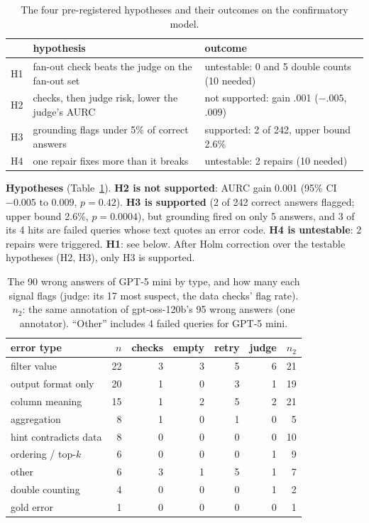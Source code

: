 \documentclass[conference]{IEEEtran}
\begin{document}
\begin{table}[t]
\centering\footnotesize
\setlength{\tabcolsep}{3pt}
\begin{tabular}{@{}lp{36mm}p{38mm}@{}}
\toprule
 & hypothesis & outcome \\
\midrule
H1 & fan-out check beats the judge on the fan-out set & untestable: 0 and 5 double counts (10 needed) \\
H2 & checks, then judge risk, lower the judge's AURC & not supported: gain .001 ($-.005$, $.009$) \\
H3 & grounding flags under 5\% of correct answers & supported: 2 of 242, upper bound 2.6\% \\
H4 & one repair fixes more than it breaks & untestable: 2 repairs (10 needed) \\
\bottomrule
\end{tabular}
\caption{The four pre-registered hypotheses and their outcomes on the confirmatory model.}
\label{tab:hyp}
\end{table}

\textbf{Hypotheses} (Table~\ref{tab:hyp}). \textbf{H2 is not supported}: AURC gain 0.001 (95\% CI $-0.005$ to $0.009$,
$p=0.42$). \textbf{H3 is supported} (2 of 242 correct answers flagged; upper bound 2.6\%,
$p=0.0004$), but grounding fired on only 5 answers, and 3 of its 4 hits are failed queries whose text
quotes an error code. \textbf{H4 is untestable}: 2 repairs were triggered. \textbf{H1}: see below.
After Holm correction over the testable hypotheses (H2, H3), only H3 is supported.

\begin{table}[t]
\centering\small
\setlength{\tabcolsep}{3pt}
\begin{tabular}{lrrrrrr}
\toprule
error type & $n$ & checks & empty & retry & judge & $n_2$ \\
\midrule
filter value & 22 & 3 & 3 & 5 & 6 & 21 \\
output format only & 20 & 1 & 0 & 3 & 1 & 19 \\
column meaning & 15 & 1 & 2 & 5 & 2 & 21 \\
aggregation & 8 & 1 & 0 & 1 & 0 & 5 \\
hint contradicts data & 8 & 0 & 0 & 0 & 0 & 10 \\
ordering / top-$k$ & 6 & 0 & 0 & 0 & 1 & 9 \\
other & 6 & 3 & 1 & 5 & 1 & 7 \\
double counting & 4 & 0 & 0 & 0 & 1 & 2 \\
gold error & 1 & 0 & 0 & 0 & 0 & 1 \\
\bottomrule
\end{tabular}
\caption{The 90 wrong answers of GPT-5 mini by type, and how many each signal flags (judge: its 17 most
suspect, the data checks' flag rate). $n_2$: the same annotation of gpt-oss-120b's 95 wrong answers
(one annotator). ``Other'' includes 4 failed queries for GPT-5 mini.}
\label{tab:errors}
\end{table}
\end{document}
